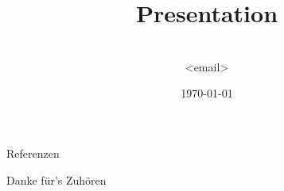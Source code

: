 \documentclass{beamer}%
\title{Presentation}
\author{\\\tiny{<email>}}
\institute[]{}
\date{\today}
\begin{document}

\frame{
	\titlepage
}


\begin{frame}{Referenzen}
\begin{tiny}

\end{tiny}

\begin{center}\LARGE{Danke für's Zuhören}\end{center}

\end{frame}

\end{document}
